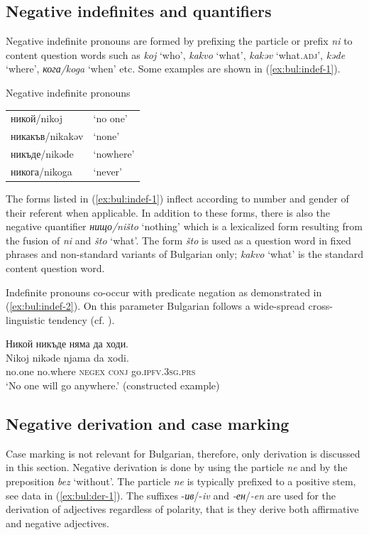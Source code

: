 \documentclass[output=paper,colorlinks=true, citecolor=brown]{langscibook}
\begin{document}
\subsection{Negative indefinites and quantifiers}
Negative indefinite pronouns are formed by prefixing the particle or prefix \textit{ni} to content question words such as \textit{koj} `who', \textit{kakvo} `what', \textit{kakəv} `what.\textsc{adj}', \textit{kəde} `where', \textit{кога/koga} `when' etc. Some examples are shown in (\ref{ex:bul:indef-1}).

\ea\label{ex:bul:indef-1}Negative indefinite pronouns\\
    \begin{tabular}{ll}
        никой/nikoj & `no one'\\
        никакъв/nikakəv & `none'\\
        никъде/nikəde & `nowhere'\\
        никога/nikoga & `never'\\
    \end{tabular}
\z


The forms listed in (\ref{ex:bul:indef-1}) inflect according to number and gender of their referent when applicable. In addition  to these forms, there is also the negative quantifier \textit{нищо/ništo} `nothing' which is a lexicalized form resulting from the fusion of \textit{ni} and \textit{što} `what'. The form \textit{što} is used as a question word in fixed phrases and non-standard variants of Bulgarian only; \textit{kakvo} `what' is the standard content question word.

Indefinite pronouns co-occur with predicate negation as demonstrated in (\ref{ex:bul:indef-2}). On this parameter Bulgarian follows a wide-spread cross-linguistic tendency (cf. \citealt{Haspelmath2013-wals115}).

  \ea Никой никъде няма да ходи. \\ \label{ex:bul:indef-2}
  	\gll Nikoj nikəde njama da xodi.\\
     no.one no.where \textsc{negex} \textsc{conj} go.\textsc{ipfv.3sg.prs}\\
\glt `No one will go anywhere.' (constructed example)

\z 
\subsection{Negative derivation and case marking}
Case marking is not relevant for Bulgarian, therefore, only derivation is discussed in this section. Negative derivation is done by using the particle \textit{ne} and by the preposition \textit{bez} `without'. The particle \textit{ne} is typically prefixed to a positive stem, see data in (\ref{ex:bul:der-1}). The suffixes -\textit{ив}\slash -\textit{iv} and \textit{-ен}\slash \textit{-en} are used for the derivation of adjectives regardless of polarity, that is they derive both affirmative and negative adjectives.
\end{document}
